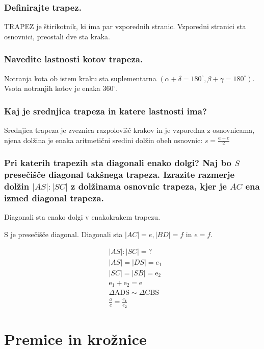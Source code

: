 \documentclass{article}
\begin{document}
\subsubsection*{Definirajte trapez.}

TRAPEZ je štirikotnik, ki ima par vzporednih stranic. Vzporedni stranici sta osnovnici, preostali dve sta kraka.

\subsubsection*{Navedite lastnosti kotov trapeza.}

Notranja kota ob istem kraku sta suplementarna $\left(\alpha+\delta=180^{\circ}, \beta+\gamma=180^{\circ}\right)$. Vsota notranjih kotov je enaka $360^{\circ}$.

\subsubsection*{Kaj je srednjica trapeza in katere lastnosti ima?}

 Srednjica trapeza je zveznica razpolovišč krakov in je vzporedna z osnovnicama, njena dolžina je enaka aritmetični sredini dolžin obeh osnovnic: $s=\frac{a+c}{2}$

\subsubsection*{Pri katerih trapezih sta diagonali enako dolgi? Naj bo $S$ presečišče diagonal takšnega trapeza. Izrazite razmerje dolžin $|A S|:|S C|$ z dolžinama osnovnic trapeza, kjer je $A C$ ena izmed diagonal trapeza.}

Diagonali sta enako dolgi v enakokrakem trapezu. 

S je presečišče diagonal. Diagonali sta $|A C|=e,|B D|=f$ in $e=f$.

$$
\begin{aligned}
& |A S|:|S C|=? \\
& |A S|=|D S|=e_{1} \\
& |S C|=|S B|=\mathrm{e}_{2} \\
& \mathrm{e}_{1}+\mathrm{e}_{2}=\mathrm{e} \\
& \Delta \mathrm{ADS} \sim \Delta \mathrm{CBS} \\
& \frac{a}{c}=\frac{e_{\mathbf{1}}}{e_{\mathbf{2}}}
\end{aligned}
$$

\section{Premice in krožnice}
\end{document}
